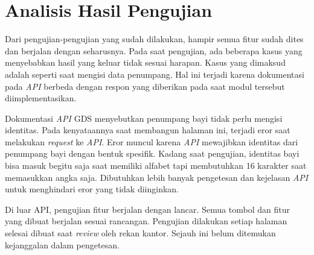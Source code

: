 \section{Analisis Hasil Pengujian}
\label{sec:analisishasiluji} 

Dari pengujian-pengujian yang sudah dilakukan, hampir semua fitur sudah dites dan berjalan dengan seharusnya. Pada saat pengujian, ada beberapa kasus yang menyebabkan hasil yang keluar tidak sesuai harapan. Kasus yang dimaksud adalah seperti saat mengisi data penumpang. Hal ini terjadi karena dokumentasi pada \textit{API} berbeda dengan respon yang diberikan pada saat modul tersebut diimplementasikan. 

Dokumentasi \textit{API} GDS menyebutkan penumpang bayi tidak perlu mengisi identitas. Pada kenyataannya saat membangun halaman ini, terjadi eror saat melakukan \textit{request} ke \textit{API}. Eror muncul karena \textit{API} mewajibkan identitas dari penumpang bayi dengan bentuk spesifik. Kadang saat pengujian, identitas bayi bisa masuk begitu saja saat memiliki alfabet tapi membutuhkan 16 karakter saat memasukkan angka saja. Dibutuhkan lebih banyak pengetesan dan kejelasan \textit{API} untuk menghindari eror yang tidak diinginkan.

Di luar API, pengujian fitur berjalan dengan lancar. Semua tombol dan fitur yang dibuat berjalan sesuai rancangan. Pengujian dilakukan setiap halaman selesai dibuat saat \textit{review} oleh rekan kantor. Sejauh ini belum ditemukan kejanggalan dalam pengetesan.